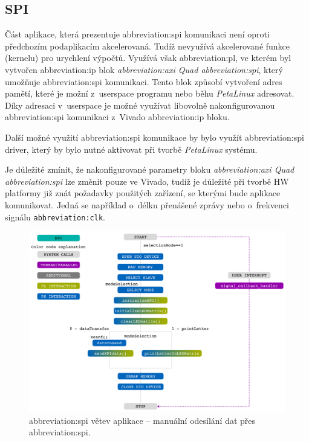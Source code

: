 \documentclass[a4paper, twoside, 11pt]{article}
\newcommand{\fbar}{\FloatBarrier}
\begin{document}
	   \fbar
	   \subsection{SPI}\label{subsec:spi}
	   Část aplikace, která prezentuje \gls{abbreviation:spi} komunikaci není oproti předchozím podaplikacím akcelerovaná. Tudíž nevyužívá akcelerované funkce (kernelu) pro urychlení výpočtů. Využívá však \gls{abbreviation:pl}, ve kterém byl vytvořen \gls{abbreviation:ip} blok \textit{\gls{abbreviation:axi} Quad \gls{abbreviation:spi}}, který umožňuje \gls{abbreviation:spi} komunikaci. Tento blok způsobí vytvoření adres pamětí, které je možní z~userspace programu nebo běhu \textit{PetaLinux} adresovat. Díky adresaci v~userspace je možné využívat libovolně nakonfigurovanou \gls{abbreviation:spi} komunikaci z~Vivado \gls{abbreviation:ip} bloku.\par
	   Další možné využití \gls{abbreviation:spi} komunikace by bylo využít \gls{abbreviation:spi} driver, který by bylo nutné aktivovat při tvorbě \textit{PetaLinux} systému.\par
	   Je důležité zmínit, že nakonfigurované parametry bloku \textit{\gls{abbreviation:axi} Quad \gls{abbreviation:spi}} lze změnit pouze ve Vivado, tudíž je důležité při tvorbě HW platformy již znát požadavky použitých zařízení, se kterými bude aplikace komunikovat. Jedná se například o~délku přenášené zprávy nebo o~frekvenci signálu \texttt{\gls{abbreviation:clk}}.\par
	   
	   \begin{figure}[htbp!]
			\centering
			\includegraphics[width=1\textwidth]{src/pdf/spi.pdf}
			\caption{\gls{abbreviation:spi} větev aplikace – manuální odesílání dat přes \gls{abbreviation:spi}.}
			\label{fig:spi}
	\end{figure}
\end{document}

